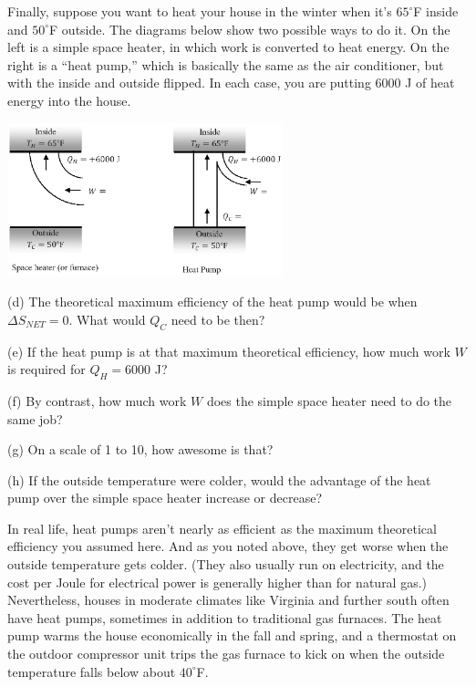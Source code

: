 \pagebreak[2]
Finally, suppose you want to heat your house in the winter when it's $65^\circ$F inside and $50^\circ$F outside.  The diagrams below show two possible ways to do it.  On the left is a simple space heater, in which work is converted to heat energy.  On the right is a ``heat pump,'' which is basically the same as the air conditioner, but with the inside and outside flipped.  In each case, you are putting 6000 J of heat energy into the house.

\begin{center}
\vspace{-0.2 in}
\includegraphics[width=0.6\textwidth]{entropy_is_it_possible/fig7.eps}
\vspace{-0.1 in}
\end{center}

(d) The theoretical maximum efficiency of the heat pump would be when $\Delta S_{NET}=0$.  What would $Q_C$ need to be then?
\answerspace{1.2 in}

(e) If the heat pump is at that maximum theoretical efficiency, how much work $W$ is required for $Q_H = 6000$ J?
 \answerspace{0.6 in}

(f) By contrast, how much work $W$ does the simple space heater need to do the same job? 
\answerspace{0.4 in}

(g) On a scale of 1 to 10, how awesome is that?
\answerspace{0.4 in}

(h) If the outside temperature were colder, would the advantage of the heat pump over the simple space heater increase or decrease? 
\answerspace{0.4 in}

In real life, heat pumps aren't nearly as efficient as the maximum theoretical efficiency you assumed here.  And as you noted above, they get worse when the outside temperature gets colder.  (They also usually run on electricity, and the cost per Joule for electrical power is generally higher than for natural gas.)  Nevertheless, houses in moderate climates like Virginia and further south often have heat pumps, sometimes in addition to traditional gas furnaces.  The heat pump warms the house economically in the fall and spring, and a thermostat on the outdoor compressor unit trips the gas furnace to kick on when the outside temperature falls below about $40^\circ$F.

